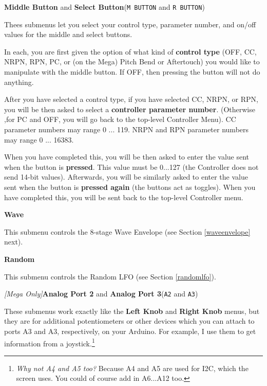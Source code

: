 \documentclass{article}
\begin{document}
\begin{description}
	\item{\bf Middle Button} and {\bf Select Button}\quad (\texttt{M BUTTON} and \texttt{R BUTTON})
	
	Thees submenus let you select your control type, parameter number, and on/off values for the middle and select buttons.
	
	In each, you are first given the option of what kind of {\bf control type} (OFF, CC, NRPN, RPN, PC, or (on the Mega) Pitch Bend or Aftertouch)%
you would like to manipulate with the middle button.  If OFF, then pressing the button will not do anything.

	After you have selected a control type, if you have selected CC, NRPN, or RPN, you will be then asked to select a {\bf controller parameter number}.  (Otherwise ,for PC and OFF, you will go back to the top-level Controller Menu).  CC parameter numbers may range 0 ... 119.  NRPN and RPN parameter numbers may range 0 ... 16383.
	
	When you have completed this, you will be then asked to enter the value sent when the button is {\bf pressed}.  This value must be 0...127 (the Controller does not send 14-bit values).  Afterwards, you will be similarly asked to enter the value sent when the button is {\bf pressed again} (the buttons act as toggles).  When you have completed this, you will be sent back to the top-level Controller menu.
	
	\item{\bf Wave}
	
	This submenu controls the 8-stage Wave Envelope (see Section \ref{waveenvelope} next).

	\item{\bf Random}
	
	This submenu controls the Random LFO (see Section \ref{randomlfo}).

	\item{\textit{[Mega Only]}\qquad }{\bf Analog Port 2} and {\bf Analog Port 3}\quad (\texttt{A2} and \texttt{A3})
	
	These submenus work exactly like the {\bf Left Knob} and {\bf Right Knob} menus, but they are for additional potentiometers or other devices which you can attach to ports A3 and A3, respectively, on your Arduino.  For example, I use them to get information from a joystick.\footnote{{\it Why not A4 and A5 too?\quad} Because A4 and A5 are used for I2C, which the screen uses.  You could of course add in A6...A12 too.}
	
	\end{description}
	
\end{document}

